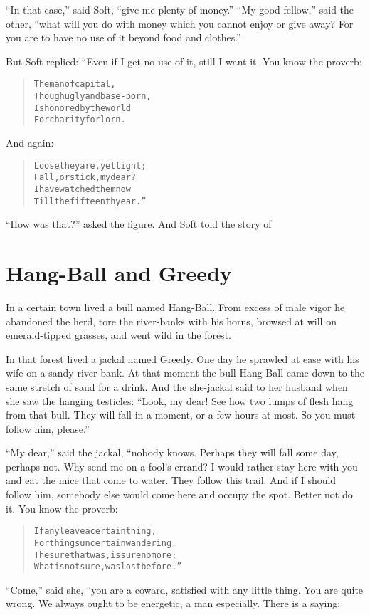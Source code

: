 \documentclass[article, twoside, 14pt]{memoir}
\renewenvironment{verbatim}{%
\begin{quote}%
\vskip -10pt%
\begin{alltt}\normalfont\large}{\end{alltt}%
\end{quote}%
\vskip -10pt
} %
\begin{document}
``In that case,'' said Soft, ``give me plenty of money.''
``My good fellow,'' said the other,
``what will you do with money which you cannot enjoy or give away? For you are to have no use of it beyond food and clothes.''

But Soft replied: “Even if I get no use of it, still I want it. You
know the proverb:

\begin{verbatim}
The man of capital,
    Though ugly and base-born,
Is honored by the world
    For charity forlorn.
\end{verbatim}
And again:

\begin{verbatim}
Loose they are, yet tight;
    Fall, or stick, my dear?
I have watched them now
    Till the fifteenth year.”
\end{verbatim}
``How was that?'' asked the figure. And Soft told the story of

\chapter{Hang-Ball and Greedy}

\label{s43}

In a certain town lived a bull named Hang-Ball. From excess of male
vigor he abandoned the herd, tore the river-banks with his horns,
browsed at will on emerald-tipped grasses, and went wild in the
forest.

In that forest lived a jackal named Greedy. One day he sprawled at
ease with his wife on a sandy river-bank. At that moment the bull
Hang-Ball came down to the same stretch of sand for a drink. And
the she-jackal said to her husband when she saw the hanging
testicles:
``Look, my dear! See how two lumps of flesh hang from that bull. They will fall in a moment, or a few hours at most. So you must follow him, please.''


``My dear,'' said the jackal, “nobody knows. Perhaps they will fall
some day, perhaps not. Why send me on a fool's errand? I would
rather stay here with you and eat the mice that come to water. They
follow this trail. And if I should follow him, somebody else would
come here and occupy the spot. Better not do it. You know the
proverb:

\begin{verbatim}
If any leave a certain thing,
For things uncertain wandering,
The sure that was, is sure no more;
What is not sure, was lost before.”
\end{verbatim}
``Come,'' said she, “you are a coward, satisfied with any little
thing. You are quite wrong. We always ought to be energetic, a man
especially. There is a saying:
\end{document}
